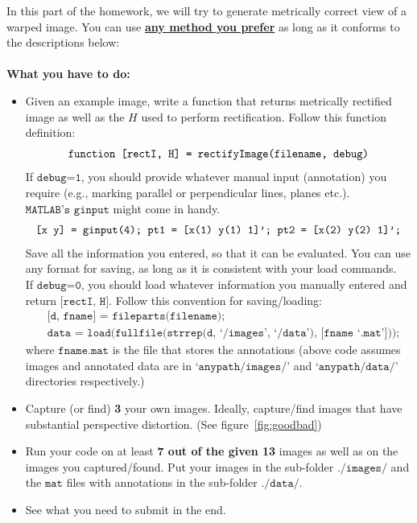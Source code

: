 \documentclass[11pt]{article}
\begin{document}
In this part of the homework, we will try to generate metrically correct view of a warped image. You can use \underline{{\bf any method you prefer}} as long as it conforms to the descriptions below:
\\
\\
{\bf What you have to do:}\vspace{-0.25in}\\
\begin{itemize}
\item Given an example image, write a function that returns metrically rectified image as well as the $H$ used to perform rectification. Follow this function definition:\vspace{-0.05in}
$$\texttt{function [rectI, H] = rectifyImage(filename, debug)}\vspace{-0.05in}$$
If $\texttt{debug=1}$, you should provide whatever manual input (annotation) you require (e.g., marking parallel or perpendicular lines, planes etc.). $\texttt{MATLAB's ginput}$ might come in handy.\vspace{-0.05in}
$$\texttt{[x y] = ginput(4); pt1 = [x(1) y(1) 1]'; pt2 = [x(2) y(2) 1]';}\vspace{-0.05in}$$
Save all the information you entered, so that it can be evaluated. You can use any format for saving, as long as it is consistent with your load commands. \\
If $\texttt{debug=0}$, you should load whatever information you manually entered and return $\texttt{[rectI, H]}$. Follow this convention for saving/loading:\vspace{-0.05in}
\begin{align*}
&\texttt{[d, fname] = fileparts(filename);}\\
&\texttt{data = load(fullfile(strrep(d, `/images', `/data'), [fname `.mat']));}
\end{align*}
where $\texttt{fname.mat}$ is the file that stores the annotations (above code assumes images and annotated data are in $\texttt{`anypath/images/'}$ and $\texttt{`anypath/data/'}$ directories respectively.)
\item Capture (or find) {\bf 3} your own images. Ideally, capture/find images that have substantial perspective distortion. (See figure~\ref{fig:goodbad})
\item Run your code on at least {\bf 7 out of the given 13} images as well as on the images you captured/found. Put your images in the sub-folder $\texttt{./images/}$ and the $\texttt{mat}$ files with annotations in the sub-folder $\texttt{./data/}$.
\item See what you need to submit in the end.
\end{itemize}
\end{document}
